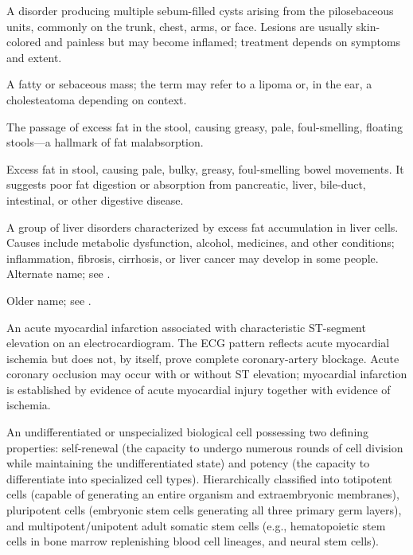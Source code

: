  A disorder producing multiple sebum-filled cysts arising from the pilosebaceous units, commonly on the trunk, chest, arms, or face. Lesions are usually skin-colored and painless but may become inflamed; treatment depends on symptoms and extent.

 A fatty or sebaceous mass; the term may refer to a lipoma or, in the ear, a cholesteatoma depending on context.

 The passage of excess fat in the stool, causing greasy, pale, foul-smelling, floating
stools—a hallmark of fat malabsorption.

 Excess fat in stool, causing pale, bulky, greasy, foul-smelling bowel movements. It suggests poor fat digestion or absorption from pancreatic, liver, bile-duct, intestinal, or other digestive disease.

 A group of liver disorders characterized by excess fat accumulation in liver cells. Causes include metabolic dysfunction, alcohol, medicines, and other conditions; inflammation, fibrosis, cirrhosis, or liver cancer may develop in some people.
 Alternate name; see .

 Older name; see .

 An acute myocardial infarction associated with characteristic ST-segment elevation
on an electrocardiogram. The ECG pattern reflects acute myocardial ischemia but does not, by itself, prove complete
coronary-artery blockage. Acute coronary occlusion may occur with or without ST elevation; myocardial infarction
is established by evidence of acute myocardial injury together with evidence of ischemia.

 An undifferentiated or unspecialized biological cell possessing two defining properties: self-renewal (the capacity to undergo numerous rounds of cell division while maintaining the undifferentiated state) and potency (the capacity to differentiate into specialized cell types). Hierarchically classified into totipotent cells (capable of generating an entire organism and extraembryonic membranes), pluripotent cells (embryonic stem cells generating all three primary germ layers), and multipotent/unipotent adult somatic stem cells (e.g., hematopoietic stem cells in bone marrow replenishing blood cell lineages, and neural stem cells).

